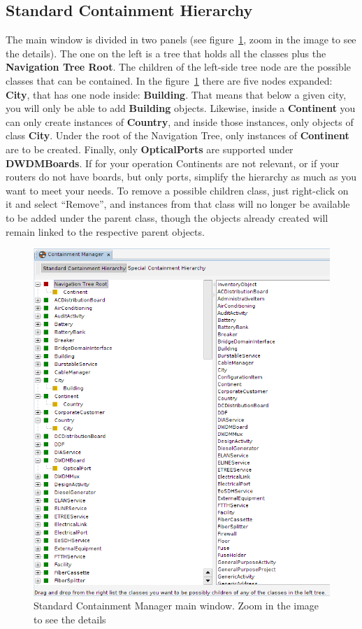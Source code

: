 \documentclass[a4paper]{article}
\begin{document}
	\subsection{Standard Containment Hierarchy} \label{sec:standard_containment_hierarchy}
	The main window is divided in two panels (see figure~\ref{fig:standard_containment_manager}, zoom in the image to see the details). The one on the left is a tree that holds all the classes plus the \textbf{Navigation Tree Root}. The children of the left-side tree node are the possible classes that can be contained. In the figure~\ref{fig:standard_containment_manager} there are five nodes expanded: \textbf{City}, that has one node inside: \textbf{Building}. That means that below a given city, you will only be able to add \textbf{Building} objects. Likewise, inside a \textbf{Continent} you can only create instances of \textbf{Country}, and inside those instances, only objects of class \textbf{City}. Under the root of the Navigation Tree, only instances of \textbf{Continent} are to be created. Finally, only \textbf{OpticalPorts} are supported under \textbf{DWDMBoards}. If for your operation Continents are not relevant, or if your routers do not have boards, but only ports, simplify the hierarchy as much as you want to meet your needs. To remove a possible children class, just right-click on it and select “Remove”, and instances from that class will no longer be available to be added under the parent class, though the objects already created will remain linked to the respective parent objects.
	
	\begin{figure}[h!]
		\centering
		\includegraphics[width=0.6\linewidth]{img/standard_containment_manager.png}
		\caption{Standard Containment Manager main window. Zoom in the image to see the details}
		\label{fig:standard_containment_manager}
	\end{figure}
	
\end{document}
